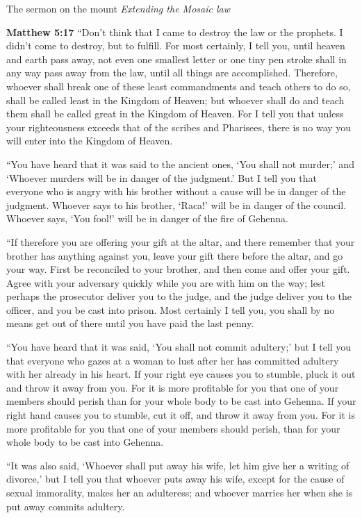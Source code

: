\documentclass[10pt,twoside]{article} %
\newcommand{\quotesize}{\normalsize{}}
\newenvironment{quotetext}{\begingroup\quotesize}{\endgroup}
\newcommand{\bible}[2]{\begin{quotetext}\textbf{#1} #2\end{quotetext}}
\newcommand{\matthew}[2]{\bible{Matthew #1}{#2}}
\newcommand{\subhead}[1]{\emph{#1}\par}
\begin{document}
\begin{section}{The sermon on the mount}
\subhead{Extending the Mosaic law}

\matthew{5:17}{
``Don't think that I came to destroy the law or the prophets. I didn't come to destroy, but to fulfill.    For most certainly, I tell you, until heaven and earth pass away, not even one smallest letter or one tiny pen stroke shall in any way pass away from the law, until all things are accomplished.    Therefore, whoever shall break one of these least commandments and teach others to do so, shall be called least in the Kingdom of Heaven; but whoever shall do and teach them shall be called great in the Kingdom of Heaven.    For I tell you that unless your righteousness exceeds that of the scribes and Pharisees, there is no way you will enter into the Kingdom of Heaven.

   ``You have heard that it was said to the ancient ones, `You shall not murder;' and `Whoever murders will be in danger of the judgment.'    But I tell you that everyone who is angry with his brother without a cause  will be in danger of the judgment. Whoever says to his brother, `Raca!' will be in danger of the council. Whoever says, `You fool!' will be in danger of the fire of Gehenna.

   ``If therefore you are offering your gift at the altar, and there remember that your brother has anything against you,    leave your gift there before the altar, and go your way. First be reconciled to your brother, and then come and offer your gift.    Agree with your adversary quickly while you are with him on the way; lest perhaps the prosecutor deliver you to the judge, and the judge deliver you to the officer, and you be cast into prison.    Most certainly I tell you, you shall by no means get out of there until you have paid the last penny.

   ``You have heard that it was said,  `You shall not commit adultery;'    but I tell you that everyone who gazes at a woman to lust after her has committed adultery with her already in his heart.    If your right eye causes you to stumble, pluck it out and throw it away from you. For it is more profitable for you that one of your members should perish than for your whole body to be cast into Gehenna.    If your right hand causes you to stumble, cut it off, and throw it away from you. For it is more profitable for you that one of your members should perish, than for your whole body to be cast into Gehenna.

   ``It was also said, `Whoever shall put away his wife, let him give her a writing of divorce,'    but I tell you that whoever puts away his wife, except for the cause of sexual immorality, makes her an adulteress; and whoever marries her when she is put away commits adultery.

}
\end{section}
\end{document}
